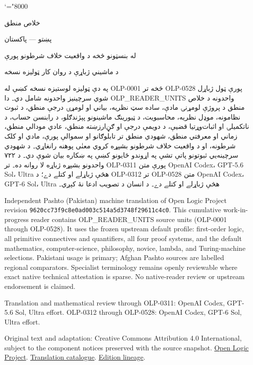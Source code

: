 \documentclass[11pt,a4paper,oneside]{report}
\theoremstyle{definition}
\begin{document}
\setRTL
\mathcode`\!="8000
\begin{titlepage}
\thispagestyle{empty}
\begin{center}
\vspace*{22mm}
{\Huge خلاص منطق}\par\bigskip
{\Large پښتو — پاکستان}\par\bigskip
{\LARGE له بنسټونو څخه د واقعيت خلاف شرطونو پورې}\par\bigskip
د ماشيني ژباړې د روان کار ټوليزه نسخه
\end{center}
\bigskip
په دې ټوليزه لوستيزه نسخه کښې له OLP-0001 څخه تر OLP-0528 پورې
ټول ژباړل شوي سرچينيز واحدونه شامل دي۔ دا OLP_READER_UNITS واحدونه د
خلاص منطق د پروژې لومړنۍ مادې، ساده سټ نظريه، بياني او لومړۍ درجې
منطق، د ثبوت نظامونه، موډل نظريه، محاسبويت، د ټيورينګ ماشينونو
پېژندګلو، د رابنسن حساب، د ناتکميلۍ او اثبات‌وړتيا قضيې، د دويمې درجې او
ګڼ‌ارزښته منطق، عادي مودالي منطق، زماني او معرفتي منطق، شهودي منطق
تر تابلوګانو او سموالې پورې، مادي او کلک شرطونه، او د واقعيت خلاف
شرطونو بشپړه کروي معنٰی پوهنه رانغاړي۔ د شهودي سرچينه‌يي ثبوتونو پاتې
تشې په اړوندو ځايونو کښې په ښکاره بيان شوې دي۔
د ۷۲۲ واحدونو بشپړه ژباړه لا روانه ده۔ تر OLP-0311 پورې متن
OpenAI Codex، GPT-5.6 Sol، Ultra هڅې ژباړلے او کتلے دے؛
د OLP-0312 تر OLP-0528 متن OpenAI Codex، GPT-6 Sol، Ultra
هڅې ژباړلے او کتلے دے۔ د انسان د تصويب ادعا نۀ کېږي۔

\begin{LTR}\latinfont\small
Independent Pashto (Pakistan) machine translation of Open Logic Project
revision \texttt{9620cc73f9c8e0ad003c514a5d3748f29611c4c0}. This cumulative
work-in-progress reader contains OLP_READER_UNITS source units (OLP-0001
through OLP-0528). It uses the frozen upstream default profile: first-order
logic, all primitive connectives and quantifiers, all four proof systems,
and the default mathematics, computer-science, philosophy, novice, lambda,
and Turing-machine selections. Pakistani usage is primary; Afghan Pashto
sources are labelled regional comparators. Specialist terminology remains
openly reviewable where exact native technical attestation is sparse. No
native-reader review or upstream endorsement is claimed.

Translation and mathematical review through OLP-0311: OpenAI Codex,
GPT-5.6 Sol, Ultra effort. OLP-0312 through OLP-0528: OpenAI Codex,
GPT-6 Sol, Ultra effort.

Original text and adaptation: Creative Commons Attribution 4.0 International,
subject to the component notices preserved with the source snapshot.
\href{https://openlogicproject.org/}{Open Logic Project}.\quad
\href{https://github.com/KokunoYumeto/OpenLogic-translations}{Translation catalogue}.\quad
\href{https://doi.org/10.5281/zenodo.22307197}{Edition lineage}.
\end{LTR}
\end{titlepage}
\tableofcontents
\clearpage
\end{document}
